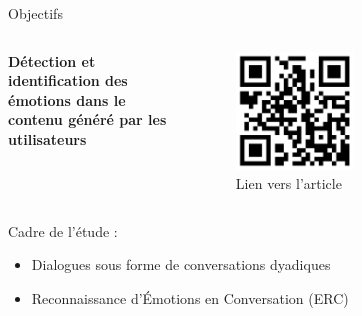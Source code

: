 \documentclass[11pt,aspectratio=169]{beamer}
\begin{document}
\begin{frame}{Objectifs}
    \vspace{-10pt}
    \begin{columns}
        \begin{column}[b]{0.70\linewidth}
            \begin{center}
                \textcolor{roose}{\bf Détection et identification des émotions dans le contenu généré par les utilisateurs}
            \end{center}
        \end{column}
        \begin{column}[c]{0.2\linewidth}
            \begin{figure}
                \centering
                \captionsetup{labelformat=empty}
                \includegraphics[width=0.5\textwidth]{qrcode.jpg}
                \caption{\centering Lien vers l'article}
            \end{figure}
        \end{column}
    \end{columns}
    \vspace{-15pt}
    Cadre de l'étude :
    \begin{itemize}
        \item Dialogues sous forme de conversations dyadiques %
        \item Reconnaissance d'Émotions en Conversation (ERC) %
    \end{itemize}
    \vspace{8pt}
\end{frame}
\end{document}
